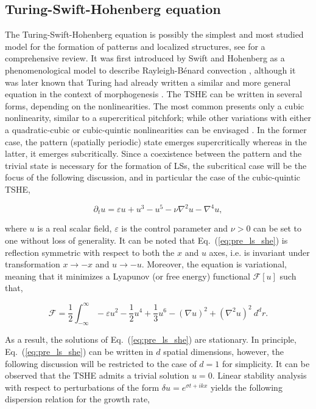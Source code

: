 \subsection{Turing-Swift-Hohenberg equation}

The Turing-Swift-Hohenberg equation is possibly the simplest and most studied model 
for the formation of patterns and localized structures, see \cite{cross1993pattern,knobloch2015spatial}
for a comprehensive review. It was first introduced
by Swift and Hohenberg as a phenomenological model to describe Rayleigh-Bénard
convection \cite{swift1977hydrodynamic,pomeau1979stability}, although it was later 
known that Turing had already written 
a similar and more general equation in the context of morphogenesis \cite{dawes2016after}.
The TSHE can be written in several forms, depending on the nonlinearities. The most common
presents only a cubic nonlinearity, similar to a supercritical pitchfork; while other
variations with either a quadratic-cubic or cubic-quintic nonlinearities can be envisaged \cite{burke2007snakes,knobloch2015spatial}.
In the former case, the pattern (spatially periodic) state emerges supercritically whereas in the latter,
it emerges subcritically. Since a coexistence between the pattern and the trivial state is necessary for the formation of LSs,
the subcritical case will be the focus of the following discussion, and in particular the case of 
the cubic-quintic TSHE,

\begin{equation}
    \partial_t u = \varepsilon u + u ^3 - u^5 - \nu \nabla^2 u - \nabla^4 u,
    \label{eq:pre_ls_she}
\end{equation}

where $u$ is a real scalar field, $\varepsilon$ is the control parameter and $\nu>0$ can be set to
one without loss of generality. It can be noted that Eq.~(\ref{eq:pre_ls_she}) is reflection symmetric
with respect to both the $x$ and $u$ axes, i.e. is invariant under transformation $x\to -x$ and $u\to -u$.
Moreover, the equation is variational, meaning that it minimizes a Lyapunov (or free energy) functional
$\mathcal{F}[u]$ such that,

\begin{equation}
    \mathcal{F} = \dfrac12 \int_{-\infty}^{\infty} -\varepsilon u^2 - \dfrac12 u^4 + \dfrac13 u^6 - (\nabla u)^2 + (\nabla^2 u)^2 \ d^dr.
\end{equation}

As a result, the solutions of Eq.~(\ref{eq:pre_ls_she}) are stationary.
In principle, Eq.~(\ref{eq:pre_ls_she}) can be written in 
$d$ spatial dimensions, however, the following discussion will be restricted to the case of $d=1$ for simplicity.
It can be observed that the TSHE admits a trivial solution $u=0$. Linear
stability analysis with respect to perturbations of the form $\delta u = e^{\sigma t + ikx}$ yields
the following dispersion relation for the growth rate,

